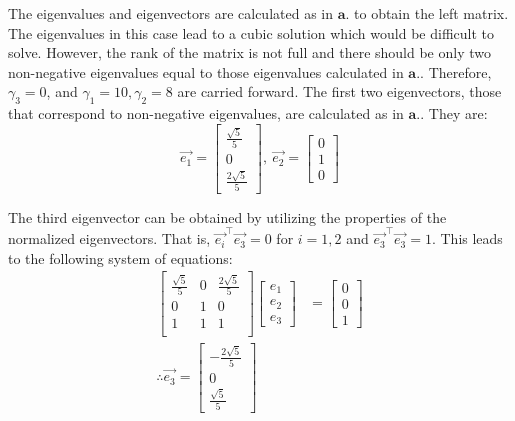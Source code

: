 \documentclass[oneside,12pt,letterpaper]{article}
\begin{document}
\begin{enumerate}
\begin{enumerate}
					The eigenvalues and eigenvectors are calculated as in $\textbf{a.}$ to obtain the left matrix. The eigenvalues in this case lead to a cubic solution which would be difficult to solve. However, the rank of the matrix is not full and there should be only two non-negative eigenvalues equal to those eigenvalues calculated in $\textbf{a.}$. Therefore, $\gamma_{3} = 0$, and $\gamma_{1} = 10, \gamma_{2} = 8$ are carried forward. The first two eigenvectors, those that correspond to non-negative eigenvalues, are calculated as in $\textbf{a.}$. They are:
					$$\vec{e_{1}} =
					\begin{bmatrix}
						\frac{\sqrt{5}}{5} \\
						0 \\
						\frac{2\sqrt{5}}{5}
					\end{bmatrix},\ 
					\vec{e_{2}} =
					\begin{bmatrix}
						0 \\
						1 \\
						0
					\end{bmatrix}$$

					The third eigenvector can be obtained by utilizing the properties of the normalized eigenvectors. That is, $\vec{e_{i}}^{\intercal}\vec{e_{3}} = 0$ for $i = 1, 2$ and $\vec{e_{3}}^{\intercal}\vec{e_{3}} = 1$. This leads to the following system of equations:
					\begin{align*}
						\begin{bmatrix}
							\frac{\sqrt{5}}{5} & 0 & \frac{2 \sqrt{5}}{5} \\
							0 & 1 & 0 \\
							1 & 1 & 1 \\
						\end{bmatrix}
						\begin{bmatrix}
							e_{1} \\
							e_{2} \\
							e_{3}
						\end{bmatrix} &=
						\begin{bmatrix}
							0 \\
							0 \\
							1
						\end{bmatrix} \\
						\therefore \vec{e_{3}} = 
						\begin{bmatrix}
							- \frac{2 \sqrt{5}}{5} \\
							0 \\
							\frac{\sqrt{5}}{5}
						\end{bmatrix}
					\end{align*}
				

\end{enumerate}
\end{enumerate}
\end{document}
